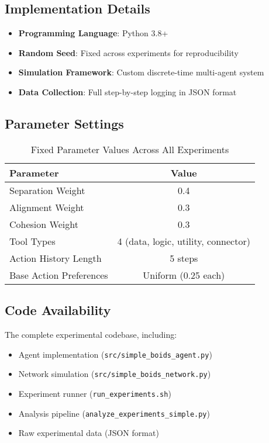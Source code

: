 \documentclass[10pt]{article}
\begin{document}
\subsection{Implementation Details}

\begin{itemize}
\item \textbf{Programming Language}: Python 3.8+
\item \textbf{Random Seed}: Fixed across experiments for reproducibility
\item \textbf{Simulation Framework}: Custom discrete-time multi-agent system
\item \textbf{Data Collection}: Full step-by-step logging in JSON format
\end{itemize}

\subsection{Parameter Settings}

\begin{table}[H]
\centering
\caption{Fixed Parameter Values Across All Experiments}
\begin{tabular}{@{}lc@{}}
\toprule
\textbf{Parameter} & \textbf{Value} \\
\midrule
Separation Weight & 0.4 \\
Alignment Weight & 0.3 \\
Cohesion Weight & 0.3 \\
Tool Types & 4 (data, logic, utility, connector) \\
Action History Length & 5 steps \\
Base Action Preferences & Uniform (0.25 each) \\
\bottomrule
\end{tabular}
\end{table}

\subsection{Code Availability}

The complete experimental codebase, including:
\begin{itemize}
\item Agent implementation (\texttt{src/simple\_boids\_agent.py})
\item Network simulation (\texttt{src/simple\_boids\_network.py})
\item Experiment runner (\texttt{run\_experiments.sh})
\item Analysis pipeline (\texttt{analyze\_experiments\_simple.py})
\item Raw experimental data (JSON format)
\end{itemize}
\end{document}
